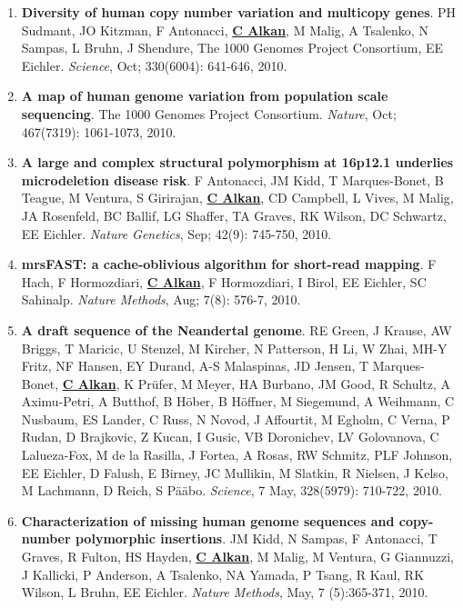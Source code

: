 \begin{enumerate}
\item
{\bf Diversity of human copy number variation and multicopy genes}. PH Sudmant, JO Kitzman, F Antonacci, 
{\bf {\underline {C Alkan}}}, M Malig, A Tsalenko, N Sampas, L Bruhn, J Shendure, The 1000 Genomes Project Consortium, EE Eichler.
{\em Science}, Oct;  330(6004): 641-646, 2010.

\item
{\bf A map of human genome variation from population scale sequencing}. The 1000 Genomes Project Consortium.
{\em Nature}, Oct;  467(7319): 1061-1073, 2010.

\item
{\bf A large and complex structural polymorphism at 16p12.1 underlies microdeletion disease risk}. F Antonacci, JM Kidd,
 T Marques-Bonet, B Teague, M Ventura, S Girirajan, {\bf {\underline {C Alkan}}}, CD Campbell, L Vives, M Malig, 
JA Rosenfeld, BC Ballif, LG Shaffer, TA Graves, RK Wilson, DC Schwartz, EE Eichler. {\em Nature 
Genetics}, Sep;  42(9): 745-750, 2010.

\item
{\bf mrsFAST: a cache-oblivious algorithm for short-read mapping}. F  Hach,  F Hormozdiari, {\bf {\underline {C Alkan}}}, F Hormozdiari,
 I Birol,  EE Eichler, SC Sahinalp. {\em Nature Methods}, Aug;  7(8): 576-7, 2010.

\item
 {\bf A draft sequence of the Neandertal genome}. RE Green, J Krause, 
AW Briggs, T Maricic, U Stenzel, M Kircher, N Patterson, 
H Li, W Zhai, MH-Y Fritz, NF Hansen, EY Durand, 
A-S Malaspinas, JD Jensen, T Marques-Bonet, {\bf {\underline {C Alkan}}}, K Pr\"{u}fer, M Meyer, HA Burbano, JM Good, R Schultz, A Aximu-Petri, 
A Butthof, B H\"{o}ber, B H\"{o}ffner, M Siegemund, A Weihmann, C
Nusbaum, ES Lander, C Russ, N Novod, J Affourtit, M Egholm, 
C Verna, P Rudan, D Brajkovic, Z Kucan, I Gusic, VB 
Doronichev, LV Golovanova, C Lalueza-Fox, M de la Rasilla, J Fortea, 
A Rosas, RW Schmitz, PLF Johnson, EE Eichler, D Falush, E 
Birney, JC Mullikin, M Slatkin, R Nielsen, J Kelso, M Lachmann, 
D Reich, S P\"{a}\"{a}bo. {\em Science}, 7 May, 328(5979): 710-722, 2010. \\


\item
{\bf Characterization of missing human genome sequences and
copy-number polymorphic insertions}.
JM Kidd, N Sampas, F Antonacci, T Graves, R Fulton, HS Hayden, {\bf {\underline{C Alkan}}},
 M Malig, M Ventura, G Giannuzzi, J Kallicki, P Anderson, A Tsalenko, 
NA Yamada, P Tsang, R Kaul, RK Wilson, L Bruhn, EE Eichler.
{\em Nature Methods}, May, 7 (5):365-371, 2010.



\end{enumerate}
